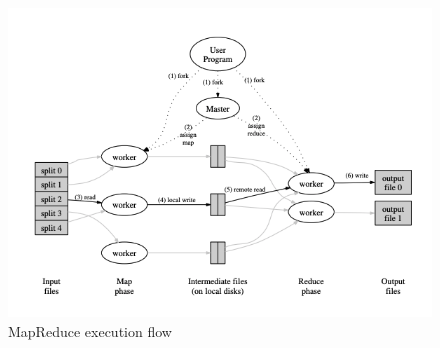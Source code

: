 \begin{figure}[!ht]
    \centering
    \includegraphics[scale=0.75]{document/chapters/chapter_4/images/mapreduce_execution_flow.png}
    \caption{MapReduce execution flow \cite{google_mapreduce}}
    \label{fig:mapreduce_execution_flow}
\end{figure}

